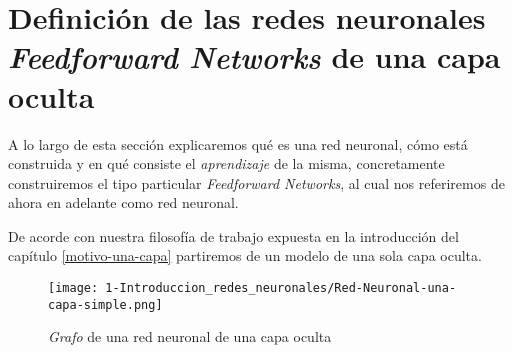 %

\section{Definición de las redes neuronales \textit{Feedforward Networks} 
de una capa oculta} \label{sec:redes-neuronales-intro-una-capa}

\reversemarginpar
\setlength{\marginparwidth}{\smallMarginSize}
\normalmarginpar
\setlength{\marginparwidth}{\bigMarginSize}


A lo largo de esta sección  explicaremos qué es una red neuronal, cómo está construida y en qué consiste el \textit{aprendizaje} de la misma, concretamente
construiremos el tipo particular \textit{Feedforward Networks}, al cual nos referiremos de ahora
en adelante como red neuronal.

De acorde con nuestra filosofía de trabajo expuesta en la introducción del capítulo \ref{motivo-una-capa} partiremos de un modelo de una sola capa oculta. 

\begin{figure}[h!]
    \centering
    \texttt{[image: 1-Introduccion\_redes\_neuronales/Red-Neuronal-una-capa-simple.png]}
    \caption{\textit{Grafo} de una red neuronal de una capa oculta}
    \label{img:grafo-red-neuronal-una-capa-oculta}
\end{figure}

\normalmarginpar
\setlength{\marginparwidth}{\bigMarginSize}

